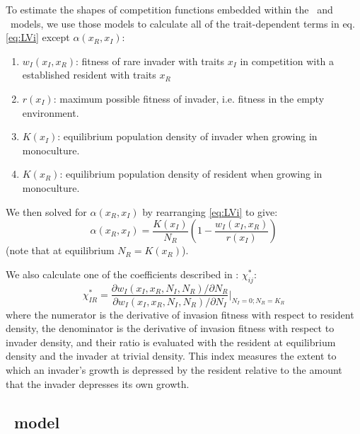 \documentclass[a4paper,11pt]{article}
\begin{document}
To estimate the shapes of competition functions embedded within the
\Rstar\ and \plant\ models, we use those models to calculate all of
the trait-dependent terms in eq. \ref{eq:LVi} except $\alpha(x_R,
x_I)$:
\begin{enumerate}
\item $w_I(x_I, x_R)$: fitness of rare invader with traits $x_I$  in
  competition with a established resident with traits $x_R$
\item $r(x_I)$: maximum possible fitness of invader, i.e. fitness in
  the empty environment.
\item $K(x_I)$: equilibrium population density of invader when growing
  in monoculture.
\item $K(x_R)$: equilibrium population density of resident when
  growing in monoculture.
\end{enumerate}
We then solved for $\alpha(x_R, x_I)$ by rearranging  \ref{eq:LVi} to give:
\begin{equation}
  \label{eq:alpha}
  \alpha(x_R, x_I) = \frac{K(x_I)}{N_R}
  \left(1 - \frac{w_I(x_I, x_R)}{r(x_I)}\right)
\end{equation}
(note that at equilibrium $N_R = K(x_R)$).

We also calculate one of the coefficients described in
\citet{Abrams-2008}: $\chi_{ij}^{*}$:
%
\begin{equation}
  \label{eq:abrams-coef}
  \chi_{IR}^{*} =
  \frac{\partial w_I(x_I, x_R, N_I, N_R) /  \partial N_R}%
  {\partial w_I(x_I, x_R, N_I, N_R) / \partial N_I}
  \bigg|_{N_I=0; N_R=K_{R}}
\end{equation}
%
where the numerator is the derivative of invasion fitness with respect
to resident density, the denominator is the derivative of invasion
fitness with respect to invader density, and their ratio is evaluated with the resident at equilibrium density and the invader at
trivial density.  This index measures the extent to which an invader's growth is depressed by the resident relative to the amount
that the invader depresses its own growth.

\subsection{\Rstar\ model}
\end{document}
